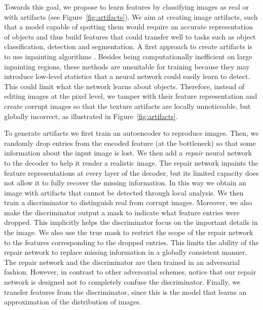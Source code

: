 \documentclass[10pt,twocolumn,letterpaper]{article}
\begin{document}
Towards this goal, we propose to learn features by classifying images as real or with artifacts (see Figure~\ref{fig:artifacts}). We aim at creating image artifacts, such that a model capable of spotting them would require an accurate representation of objects and thus build features that could transfer well to tasks such as object classification, detection and segmentation. 
A first approach to create artifacts is to use inpainting algorithms \cite{bertalmio2000image,denton2016semi}. Besides being computationally inefficient on large inpainting regions, these methods are unsuitable for training because they may introduce low-level statistics that a neural network could easily learn to detect. This could limit what the network learns about objects.
Therefore, instead of editing images at the pixel level, we tamper with their feature representation and create corrupt images so that the texture artifacts are locally unnoticeable, but globally incorrect, as illustrated in Figure~\ref{fig:artifacts}.

To generate artifacts we first train an autoencoder to reproduce images. Then, we randomly drop entries from the encoded feature (at the bottleneck) so that some information about the input image is lost. We then add a \emph{repair} neural network to the decoder to help it render a realistic image. The repair network inpaints the feature representations at every layer of the decoder, but its limited capacity does not allow it to fully recover the missing information. In this way we obtain an image with artifacts that cannot be detected through local analysis. We then train a discriminator to distinguish real from corrupt images. Moreover, we also make the discriminator output a mask to indicate what feature entries were dropped. This implicitly helps the discriminator focus on the important details in the image. We also use the true mask to restrict the scope of the repair network to the features corresponding to the dropped entries. This limits the ability of the repair network to replace missing information in a globally consistent manner. %
The repair network and the discriminator are then trained in an adversarial fashion. However, in contrast to other adversarial schemes, notice that our repair network is designed not to completely confuse the discriminator. Finally, we transfer features from the discriminator, since this is the model that learns an approximation of the distribution of images.
\end{document}
